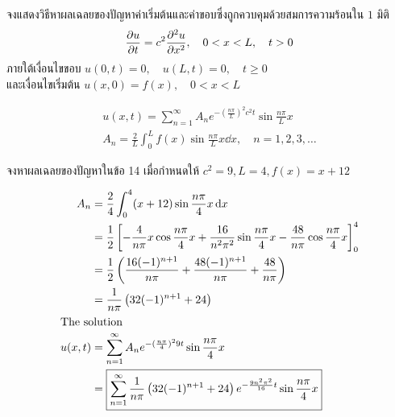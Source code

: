 \documentclass[12pt,final]{novelette} %
\begin{document}
\begin{question}[resume]
    \item {}
    จงแสดงวิธีหาผลเฉลยของปัญหาค่าเริ่มต้นและค่าขอบซึ่งถูกควบคุมด้วยสมการความร้อนใน $1$ มิติ
    $$
        \pdv{u}{t} = c^2 \pdv[2]{u}{x}, \quad 0 < x < L, \quad t > 0
    $$
    ภายใต้เงื่อนไขขอบ \quad $u(0, t) = 0, \quad u(L, t) = 0, \quad t \geq 0$ \\
    และเงื่อนไขเริ่มต้น \quad $u(x, 0) = f(x), \quad 0 < x < L$ 

    $$
        \boxed{
            \begin{array}{c} \displaystyle
                u(x,t) = \sum_{n=1}^\infty A_n e^{-(\frac{n\pi}{L})^2c^2t} \sin\frac{n\pi}{L}x \\[1em]
                \displaystyle A_n = \frac{2}{L} \int_0^L f(x) \sin\frac{n\pi}{L} x \dd{x}, \quad n = 1,2,3,\ldots
            \end{array}
        }
    $$

    \item {}
    จงหาผลเฉลยของปัญหาในข้อ 14 เมื่อกำหนดให้ $c^2 = 9, L = 4, f(x) = x + 12$ 

    \vspace*{-1em}
    \begin{align*}
        A_n    & = \frac24 \int_0^4 (x + 12) \sin\frac{n\pi}{4}x \dd{x}                                                                                            \\
               & = \frac12 \left[-\frac{4}{n\pi} x\cos\frac{n\pi}{4} x + \frac{16}{n^2\pi^2} \sin\frac{n\pi}{4}x - \frac{48}{n\pi} \cos\frac{n\pi}{4}x \right]_0^4 \\
               & = \frac12 \left(\frac{16(-1)^{n+1}}{n\pi} + \frac{48(-1)^{n+1}}{n\pi} + \frac{48}{n\pi}\right)                                                    \\
               & = \frac{1}{n\pi} \left(32 (-1)^{n+1} + 24\right)                                                                                                  \\
        \intertext{The solution}
        u(x,t) & = \sum_{n=1}^\infty A_n e^{-(\frac{n\pi}{4})^29t} \sin\frac{n\pi}{4}x                                                                             \\
               & = \boxed{\sum_{n=1}^\infty \frac{1}{n\pi} \left(32 (-1)^{n+1} + 24\right) e^{-\frac{9n^2\pi^2}{16}t} \sin\frac{n\pi}{4}x}                         \\
    \end{align*}
\end{question}
\end{document}
